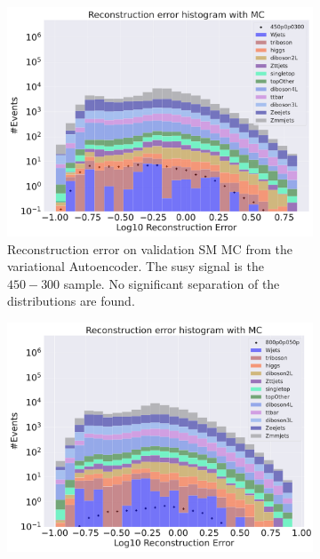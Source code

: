 \begin{figure}[h!]
    \centering
    \begin{subfigure}{.45\textwidth}
        \includegraphics[width=\textwidth]{Figures/VAE_testing/small/b_data_recon_big_rm3_feats_sig_450p0p0300.pdf}
        \caption{Reconstruction error on validation SM MC from the variational Autoencoder. The susy signal is the $450-300$ sample. 
        No significant separation of the distributions are found. }
        \label{fig:vae_susy_450_300_recon}
    \end{subfigure}
    \hfill
    \begin{subfigure}{.45\textwidth}
        \includegraphics[width=\textwidth]{Figures/VAE_testing/small/b_data_recon_big_rm3_feats_sig_800p0p050p.pdf}

\end{subfigure}
\end{figure}
